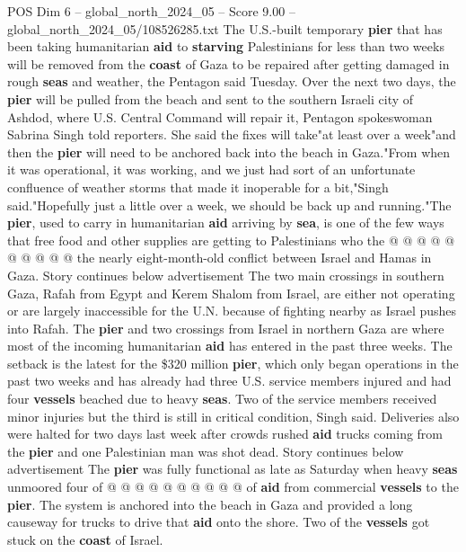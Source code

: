 \begin{textsample}{POS Dim 6 – global\_north\_2024\_05 – Score 9.00 – global\_north\_2024\_05/108526285.txt}  \label{ex:f6_pos_149}
The U.S.-built temporary \textbf{pier} that has been taking humanitarian \textbf{aid} to \textbf{starving} Palestinians for less than two weeks will be removed from the \textbf{coast} of Gaza to be repaired after getting damaged in rough \textbf{seas} and weather, the Pentagon said Tuesday.
Over the next two days, the \textbf{pier} will be pulled from the beach and sent to the southern Israeli city of Ashdod, where U.S.
Central Command will repair it, Pentagon spokeswoman Sabrina Singh told reporters.
She said the fixes will take"at least over a week"and then the \textbf{pier} will need to be anchored back into the beach in Gaza."From when it was operational, it was working, and we just had sort of an unfortunate confluence of weather storms that made it inoperable for a bit,"Singh said."Hopefully just a little over a week, we should be back up and running."The \textbf{pier}, used to carry in humanitarian \textbf{aid} arriving by \textbf{sea}, is one of the few ways that free food and other supplies are getting to Palestinians who the @ @ @ @ @ @ @ @ @ @ the nearly eight-month-old conflict between Israel and Hamas in Gaza.
Story continues below advertisement The two main crossings in southern Gaza, Rafah from Egypt and Kerem Shalom from Israel, are either not operating or are largely inaccessible for the U.N. because of fighting nearby as Israel pushes into Rafah.
The \textbf{pier} and two crossings from Israel in northern Gaza are where most of the incoming humanitarian \textbf{aid} has entered in the past three weeks.
The setback is the latest for the \$320 million \textbf{pier}, which only began operations in the past two weeks and has already had three U.S. service members injured and had four \textbf{vessels} beached due to heavy \textbf{seas}.
Two of the service members received minor injuries but the third is still in critical condition, Singh said.
Deliveries also were halted for two days last week after crowds rushed \textbf{aid} trucks coming from the \textbf{pier} and one Palestinian man was shot dead.
Story continues below advertisement The \textbf{pier} was fully functional as late as Saturday when heavy \textbf{seas} unmoored four of @ @ @ @ @ @ @ @ @ @ of \textbf{aid} from commercial \textbf{vessels} to the \textbf{pier}.
The system is anchored into the beach in Gaza and provided a long causeway for trucks to drive that \textbf{aid} onto the shore.
Two of the \textbf{vessels} got stuck on the \textbf{coast} of Israel.

\end{textsample}
